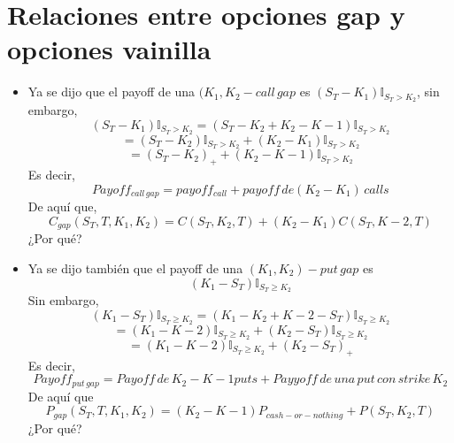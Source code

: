\documentclass[12pts]{extarticle}
\begin{document}
\section{Relaciones entre opciones gap y opciones vainilla}
\begin{itemize}
\item Ya se dijo que el payoff de una $(K_1,K_2-call \, gap$ es $(S_T-K_1)\mathbb{I}_{S_T>K_2}$, sin embargo, 
$$(S_T-K_1)\mathbb{I}_{S_T>K_2}=(S_T-K_2+K_2-K-1)\mathbb{I}_{S_T>K_2}$$
$$=(S_T-K_2)\mathbb{I}_{S_T>K_2}+(K_2-K_1)\mathbb{I}_{S_T>K_2}$$
$$=(S_T-K_2)_+ +(K_2-K-1)\mathbb{I}_{S_T>K_2}$$ 
Es decir, 
$$Payoff_{call \, gap}= payoff_{call} + payoff \, de (K_2-K_1) \, calls$$ 
De aquí que, 
$$C_{gap}(S_T,T,K_1,K_2)=C(S_T,K_2,T)+(K_2-K_1)C(S_T,K-2,T)$$
¿Por qué?
\item Ya se dijo también que el payoff de una $(K_1,K_2)-put \, gap$ es 
$$(K_1-S_T)\mathbb{I}_{S_T \geq K_2}$$
Sin embargo, 
$$(K_1-S_T)\mathbb{I}_{S_T \geq K_2}=(K_1-K_2+K-2-S_T)\mathbb{I}_{S_T \geq K_2}$$
$$=(K_1-K-2)\mathbb{I}_{S_T \geq K_2} +(K_2-S_T)\mathbb{I}_{S_T \geq K_2}$$
$$=(K_1-K-2)\mathbb{I}_{S_T \geq K_2} +(K_2-S_T)_+$$
Es decir, 
$$Payoff_{put \, gap}=Payoff \, de \, K_2-K-1 puts + Payyoff \, de \, una \, put \, con \, strike \, K_2$$
De aquí que
$$P_{gap}(S_T,T,K_1,K_2)=(K_2-K-1)P_{cash-or-nothing}+P(S_T,K_2,T)$$
¿Por qué?

\end{itemize}
\end{document}
